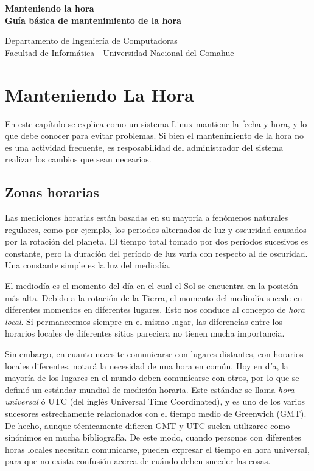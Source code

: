 \documentclass[12pt]{article}
\def\maketitle{

 \makeatletter
 {\color{bl} \centering \huge \sc \textbf{
 Manteniendo la hora \\ 
\large \vspace*{-8pt} \color{black} Guía básica de mantenimiento de la hora
 \vspace*{8pt} }\par}
 \makeatother


 \makeatletter
 {\centering \small 
 	Departamento de Ingeniería de Computadoras \\
 	Facultad de Informática - Universidad Nacional del Comahue \\
 	\vspace{20pt} }
 \makeatother

}
\begin{document}
\thispagestyle{empty}
\maketitle
\setlength{\parindent}{0pt}

\section*{ Manteniendo La Hora}

En este capítulo se explica como un sistema Linux mantiene la fecha y hora,
y lo que debe conocer para evitar problemas. Si bien el mantenimiento de
la hora no es una actividad frecuente, es resposabilidad del administrador 
del sistema realizar los cambios que sean necearios. 


\subsection*{Zonas horarias}

Las mediciones horarias están basadas en su mayoría a fenómenos naturales regulares,
como por ejemplo, los periodos alternados de luz y oscuridad
causados por la rotación del planeta. El tiempo total tomado por dos períodos
sucesivos es constante, pero la duración del período de luz varía
con respecto al de oscuridad. Una constante simple es la luz del mediodía.

El mediodía es el momento del día en el cual el Sol se encuentra en la posición más alta. 
Debido a la rotación de la Tierra, el momento del mediodía sucede en diferentes 
momentos en diferentes lugares. Esto nos conduce al concepto de \textit{hora local}.
Si permanecemos siempre en el mismo lugar, las diferencias entre los
horarios locales de diferentes sitios pareciera no tienen mucha importancia.

Sin embargo, en cuanto necesite comunicarse con lugares distantes, con horarios locales 
diferentes, notará la necesidad de una hora en común. Hoy en día, la mayoría de los lugares en el mundo deben
comunicarse con otros, por lo que se definió un estándar mundial de medición
horaria. Este estándar se llama \textit{hora universal} ó UTC (del inglés Universal 
Time Coordinated), y es uno de los varios sucesores estrechamente 
relacionados con el tiempo medio de Greenwich (GMT). De hecho, aunque técnicamente 
difieren GMT y UTC suelen utilizarce como sinónimos en mucha bibliografía.   
De este modo, cuando personas con diferentes horas locales
necesitan comunicarse, pueden expresar el tiempo en hora universal,
para que no exista confusión acerca de cuándo deben suceder las cosas.
\end{document}

